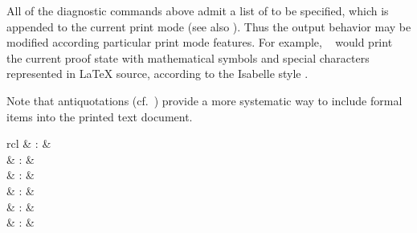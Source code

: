 \begin{isabellebody}
\begin{isamarkuptext}
\begin{descr}
  \end{descr}

  All of the diagnostic commands above admit a list of 
  to be specified, which is appended to the current print mode (see
  also \cite{isabelle-ref}).  Thus the output behavior may be modified
  according particular print mode features.  For example, \mbox{}~ would print the current
  proof state with mathematical symbols and special characters
  represented in {\LaTeX} source, according to the Isabelle style
  \cite{isabelle-sys}.

  Note that antiquotations (cf.\ ) provide a more
  systematic way to include formal items into the printed text
  document.%
\end{isamarkuptext}%
\isamarkuptrue%
%
\isamarkuptrue%
%
\begin{isamarkuptext}%
\begin{matharray}{rcl}
    \mbox{}\isa{{\isachardoublequote}\isactrlsup {\isacharasterisk}{\isachardoublequote}} & : & \isarkeep{\cdot} \\
    \mbox{}\isa{{\isachardoublequote}\isactrlsup {\isacharasterisk}{\isachardoublequote}} & : &  \\
    \mbox{}\isa{{\isachardoublequote}\isactrlsup {\isacharasterisk}{\isachardoublequote}} & : &  \\
    \mbox{}\isa{{\isachardoublequote}\isactrlsup {\isacharasterisk}{\isachardoublequote}} & : &  \\
    \mbox{}\isa{{\isachardoublequote}\isactrlsup {\isacharasterisk}{\isachardoublequote}} & : &  \\
    \mbox{}\isa{{\isachardoublequote}\isactrlsup {\isacharasterisk}{\isachardoublequote}} & : &  \\

\end{matharray}
\end{isamarkuptext}
\end{isabellebody}
